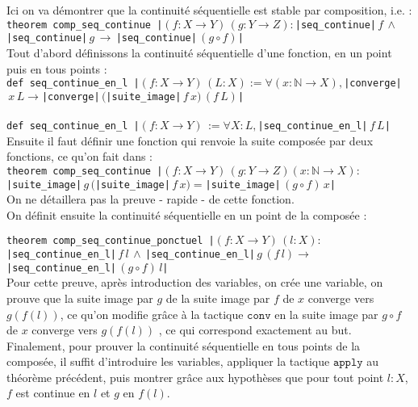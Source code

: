 Ici on va démontrer que la continuité séquentielle est stable par composition, i.e. : \\
\texttt{theorem comp_seq_continue |$(f : X \to Y) \,(g : Y \to Z) :$|seq_continue|$\, f \, \land \, $|seq_continue|$ \, g \, \to \,$|seq_continue|$ \, (g \circ f)$|} \\
Tout d'abord définissons la continuité séquentielle d'une fonction, en un point puis en tous points : \\
\texttt{def seq_continue_en_l |$(f : X \to Y) \,(L : X) := \forall (x:\mathbb{N}\to X),$|converge|$ \, x \, L \to$|converge|$ \, ($|suite_image|$ \, f \, x)\, (f \, L)$|} \\ 
\\
\texttt{def seq_continue_en_l |$(f : X \to Y) \, := \forall X : L,$|seq_continue_en_l|$ \, f \, L$|}\\

Ensuite il faut définir une fonction qui renvoie la suite composée par deux fonctions, ce qu'on fait dans : \\
\texttt{theorem comp_seq_continue |$(f : X \to Y) \,(g : Y \to Z)(x : \mathbb{N} \to X) :$|suite_image|$\, g \, ($|suite_image|$ \, f \,x) = $|suite_image|$ \, (g \circ f) \, x$|} \\
On ne détaillera pas la preuve - rapide - de cette fonction.\\
On définit ensuite la continuité séquentielle en un point de la composée : 

\texttt{theorem comp_seq_continue_ponctuel |$(f : X \to Y) \,(l : X) :$|seq_continue_en_l|$\, f \, l \, \land \, $|seq_continue_en_l|$ \, g \, (f \, l) \to \,$|seq_continue_en_l|$ \, (g \circ f) \, l$|} \\

Pour cette preuve, après introduction des variables, on crée une variable, on prouve que la suite image par $g$ de la suite image par $f$ de $x$ converge vers $g(f(l))$, ce qu'on modifie grâce à la tactique $\texttt{conv}$ en \og{}la suite image par $g \circ f$ de $x$ converge vers $g(f(l))$ \fg{}, ce qui correspond exactement au but.\\

Finalement, pour prouver la continuité séquentielle en tous points de la composée, il suffit d'introduire les variables, appliquer la tactique $\texttt{apply}$ au théorème précédent, puis montrer grâce aux hypothèses que pour tout point $l:X$, $f$ est continue en $l$ et $g$ en $f(l)$.\\
